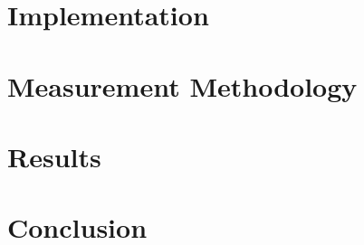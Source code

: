 \documentclass[12pt]{article}
\begin{document}
\section{Implementation}



\section{Measurement Methodology}

\section{Results}

\section{Conclusion}



\pagebreak

\begin{thebibliography}{99}
\end{thebibliography}
\end{document}
